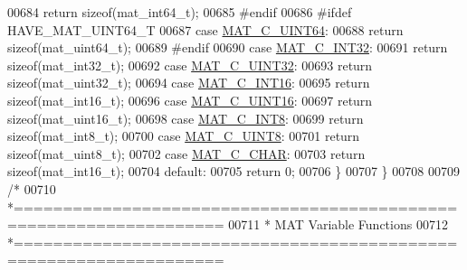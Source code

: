\begin{DoxyCode}
{{{{{{{{{{{{{{{{{{{{{00684             \textcolor{keywordflow}{return} \textcolor{keyword}{sizeof}(mat\_int64\_t);
00685 \textcolor{preprocessor}{#endif}
00686 \textcolor{preprocessor}{#ifdef HAVE\_MAT\_UINT64\_T}
00687         \textcolor{keywordflow}{case} \hyperlink{group___m_a_t_ggad4d60ae7b709fc81bfd744fb4c857c40a86470e25c3763d9a24623f04326195dd}{MAT\_C\_UINT64}:
00688             \textcolor{keywordflow}{return} \textcolor{keyword}{sizeof}(mat\_uint64\_t);
00689 \textcolor{preprocessor}{#endif}
00690         \textcolor{keywordflow}{case} \hyperlink{group___m_a_t_ggad4d60ae7b709fc81bfd744fb4c857c40adb44fc39694e3152ae5e69470a2fefe8}{MAT\_C\_INT32}:
00691             \textcolor{keywordflow}{return} \textcolor{keyword}{sizeof}(mat\_int32\_t);
00692         \textcolor{keywordflow}{case} \hyperlink{group___m_a_t_ggad4d60ae7b709fc81bfd744fb4c857c40a9a17a7edd45b19ef68197db81b27e816}{MAT\_C\_UINT32}:
00693             \textcolor{keywordflow}{return} \textcolor{keyword}{sizeof}(mat\_uint32\_t);
00694         \textcolor{keywordflow}{case} \hyperlink{group___m_a_t_ggad4d60ae7b709fc81bfd744fb4c857c40a40370e9de516c5036a67a5865c071006}{MAT\_C\_INT16}:
00695             \textcolor{keywordflow}{return} \textcolor{keyword}{sizeof}(mat\_int16\_t);
00696         \textcolor{keywordflow}{case} \hyperlink{group___m_a_t_ggad4d60ae7b709fc81bfd744fb4c857c40a8bede21dbf6c1edc0bbccc1481bccae7}{MAT\_C\_UINT16}:
00697             \textcolor{keywordflow}{return} \textcolor{keyword}{sizeof}(mat\_uint16\_t);
00698         \textcolor{keywordflow}{case} \hyperlink{group___m_a_t_ggad4d60ae7b709fc81bfd744fb4c857c40a984ff310f9e906100fcff95f704f43c5}{MAT\_C\_INT8}:
00699             \textcolor{keywordflow}{return} \textcolor{keyword}{sizeof}(mat\_int8\_t);
00700         \textcolor{keywordflow}{case} \hyperlink{group___m_a_t_ggad4d60ae7b709fc81bfd744fb4c857c40a81270f8093cb4808e992c1d29d84d4e3}{MAT\_C\_UINT8}:
00701             \textcolor{keywordflow}{return} \textcolor{keyword}{sizeof}(mat\_uint8\_t);
00702         \textcolor{keywordflow}{case} \hyperlink{group___m_a_t_ggad4d60ae7b709fc81bfd744fb4c857c40aacdec5834df0861130b393697646119c}{MAT\_C\_CHAR}:
00703             \textcolor{keywordflow}{return} \textcolor{keyword}{sizeof}(mat\_int16\_t);
00704         \textcolor{keywordflow}{default}:
00705             \textcolor{keywordflow}{return} 0;
00706     \}
00707 \}
00708 
00709 \textcolor{comment}{/*}
00710 \textcolor{comment}{ *===================================================================}
00711 \textcolor{comment}{ *    MAT Variable Functions}
00712 \textcolor{comment}{ *===================================================================}
}}}}}}}}}}}}}}}}}}}}}
\end{DoxyCode}
